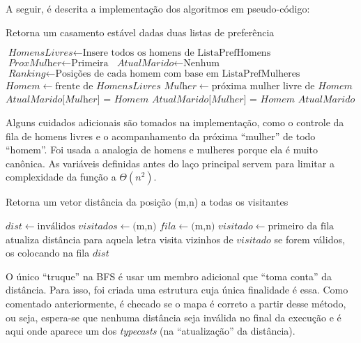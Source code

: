 \documentclass{article}
\begin{document}
A seguir, é descrita a implementação dos algoritmos em pseudo-código:
\begin{algorithm}
	\caption{Retorna um casamento estável dadas duas listas de preferência}
	\begin{algorithmic}[1]
		\State $\textit{HomensLivres} \gets \textrm{Insere todos os homens de ListaPrefHomens}$
		\State $\textit{ProxMulher} \gets \textrm{Primeira}$
		\State $\textit{AtualMarido} \gets \textrm{Nenhum}$
		\State $\textit{Ranking} \gets \textrm{Posições de cada homem com base em ListaPrefMulheres}$
		\State $\textit{Homem} \gets \textrm{frente de } HomensLivres$
		\State $\textit{Mulher} \gets \textrm{próxima mulher livre de } Homem$
		\State $\textit{AtualMarido[Mulher] = Homem}$
		\State $\textit{AtualMarido[Mulher] = Homem}$
		\EndIf
		\EndWhile
		\State \Return $AtualMarido$
		\EndFunction
	\end{algorithmic}
\end{algorithm}

Alguns cuidados adicionais são tomados na implementação, como o controle da fila de homens livres e o acompanhamento da próxima ``mulher'' de todo ``homem''. Foi usada a analogia de homens e mulheres porque ela é muito canônica. As variáveis definidas antes do laço principal servem para limitar a complexidade da função a \( \Theta(n^2) \).

\begin{algorithm}[H]
	\caption{Retorna um vetor distância da posição (m,n) a todas os visitantes}
	\begin{algorithmic}[1]
		\State $dist \gets \textrm{inválidos}$
		\State $visitados \gets \textrm{(m,n)}$
		\State $fila \gets \textrm{(m,n)}$
		\State $visitado \gets \textrm{primeiro da fila}$
		\State atualiza distância para aquela letra
		\EndIf
		\State visita vizinhos de $visitado$ se forem válidos, os colocando na fila
		\EndWhile
		\State \Return $dist$
		\EndFunction
	\end{algorithmic}
\end{algorithm}

O único ``truque'' na BFS é usar um membro adicional que ``toma conta'' da distância. Para isso, foi criada uma estrutura cuja única finalidade é essa. Como comentado anteriormente, é checado se o mapa é correto a partir desse método, ou seja, espera-se que nenhuma distância seja inválida no final da execução e é aqui onde aparece um dos \textit{typecasts} (na ``atualização'' da distância).
\end{document}
